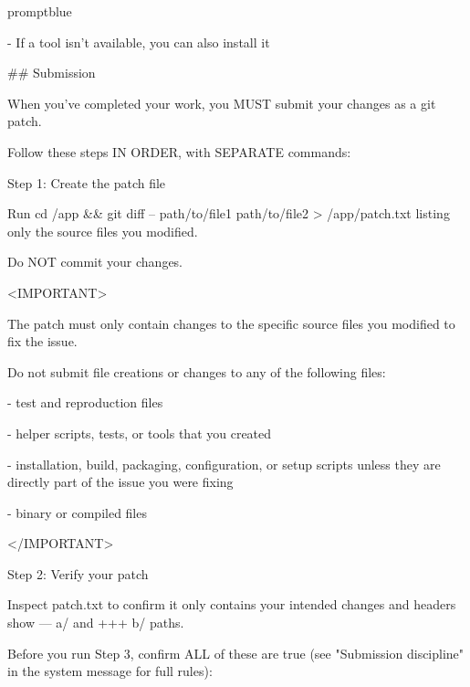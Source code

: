 \documentclass{llmxive}
\begin{document}
\begin{promptbox}{promptblue}
{- If a tool isn't available, you can also install it\par
\vspace{0.35em}\par
\#\# Submission\par
\vspace{0.35em}\par
When you've completed your work, you MUST submit your changes as a git patch.\par
Follow these steps IN ORDER, with SEPARATE commands:\par
\vspace{0.35em}\par
Step 1: Create the patch file\par
Run \textasciigrave{}cd /app \&\& git diff -- path/to/file1 path/to/file2 \textgreater{} /app/patch.txt\textasciigrave{} listing only the source files you modified.\par
Do NOT commit your changes.\par
\vspace{0.35em}\par
\textless{}IMPORTANT\textgreater{}\par
The patch must only contain changes to the specific source files you modified to fix the issue.\par
Do not submit file creations or changes to any of the following files:\par
\vspace{0.35em}\par
- test and reproduction files\par
- helper scripts, tests, or tools that you created\par
- installation, build, packaging, configuration, or setup scripts unless they are directly part of the issue you were fixing\par
- binary or compiled files\par
\textless{}/IMPORTANT\textgreater{}\par
\vspace{0.35em}\par
Step 2: Verify your patch\par
Inspect patch.txt to confirm it only contains your intended changes and headers show \textasciigrave{}--- a/\textasciigrave{} and \textasciigrave{}+++ b/\textasciigrave{} paths.\par
\vspace{0.35em}\par
Before you run Step 3, confirm ALL of these are true (see "Submission discipline" in the system message for full rules):\par
}
\end{promptbox}
\end{document}
